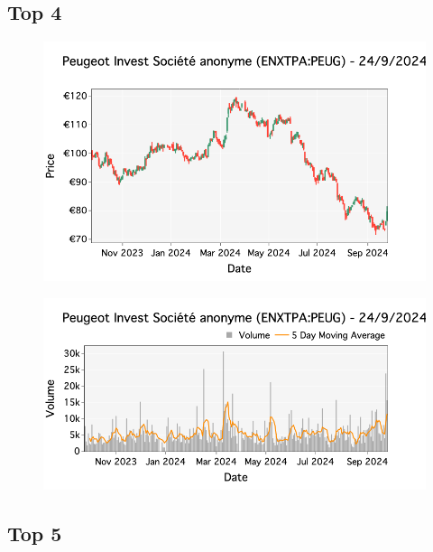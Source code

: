 \documentclass[a4paper, twocolumn, 11pt, paperequity]{gorgona}
\begin{document}
\subsection*{Top 4}

\begin{figure}[H]
    \centering
    \includegraphics[width=\columnwidth]{France/images/Top_Volume/Top_4_candlestick.png}
\end{figure}

\begin{figure}[H]
    \centering
    \includegraphics[width=\columnwidth]{France/images/Top_Volume/Top_4_volume.png}
\end{figure}

\subsection*{Top 5}
\end{document}
